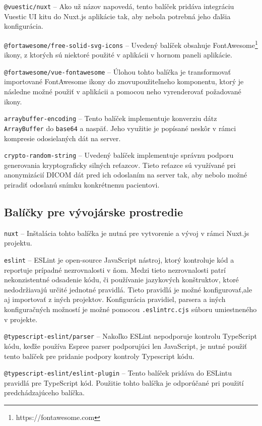 \texttt{@vuestic/nuxt} -- Ako už názov napovedá, tento balíček pridáva integráciu Vuestic UI kitu do Nuxt.js aplikácie tak, aby nebola potrebná jeho ďalšia konfigurácia.

\texttt{@fortawesome/free-solid-svg-icons} -- Uvedený balíček obsahuje FontAwesome\footnote{https://fontawesome.com} ikony, z ktorých sú niektoré použité v aplikácii v hornom paneli aplikácie.

\texttt{@fortawesome/vue-fontawesome} -- Úlohou tohto balíčka je transformovať importované FontAwesome ikony do znovupoužiteľneho komponentu, ktorý je následne možné použiť v aplikácii a pomocou neho vyrenderovať požadované ikony.

\texttt{arraybuffer-encoding} -- Tento balíček implementuje konverziu dát\newline z \texttt{ArrayBuffer} do \texttt{base64} a naspäť. Jeho využitie je popísané neskôr v rámci kompresie odosielaných dát na server.

\texttt{crypto-random-string} -- Uvedený balíček implementuje správnu podporu generovania kryptograficky silných reťazcov. Tieto reťazce sú využívané pri anonymizácií DICOM dát pred ich odoslaním na server tak, aby nebolo možné priradiť odoslanú snímku konkrétnemu pacientovi.

\subsection {Balíčky pre vývojárske prostredie}
\texttt{nuxt} -- Inštalácia tohto balíčka je nutná pre vytvorenie a vývoj v rámci Nuxt.js projektu.

\texttt{eslint} -- ESLint je open-source JavaScript nástroj, ktorý kontroluje kód a reportuje prípadné nezrovnalosti v ňom. Medzi tieto nezrovnalosti patrí nekonzistentné odsadenie kódu, či používanie jazykových konštruktov, ktoré nedodržiavajú určité jednotné pravidlá. Tieto pravidlá je možné konfigurovať,\newline ale aj importovať z iných projektov. Konfigurácia pravidiel, parsera a iných konfiguračných možností je možné pomocou \texttt{.eslintrc.cjs} súboru umiestneného v projekte.

\texttt{@typescript-eslint/parser} -- Nakoľko ESLint nepodporuje kontrolu TypeScript kódu, keďže používa Espree parser podporujúci len JavaScript, je nutné použiť tento balíček pre pridanie podpory kontroly Typescript kódu. 

\texttt{@typescript-eslint/eslint-plugin} -- Tento balíček pridáva do ESLintu pravidlá pre TypeScript kód. Použitie tohto balíčka je odporúčané pri použití predchádzajúceho balíčka.

